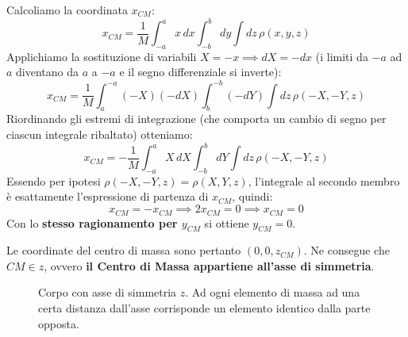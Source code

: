 Calcoliamo la coordinata $x_{CM}$:
\begin{equation}
    x_{CM} = \frac{1}{M} \int_{-a}^{a} x \, dx \int_{-b}^{b} dy \int dz \, \rho(x,y,z)
\end{equation}
Applichiamo la sostituzione di variabili $X = -x \implies dX = -dx$ (i limiti da $-a$ ad $a$ diventano da $a$ a $-a$ e il segno differenziale si inverte):
\begin{equation}
    x_{CM} = \frac{1}{M} \int_{a}^{-a} (-X) (-dX) \int_{b}^{-b} (-dY) \int dz \, \rho(-X,-Y,z)
\end{equation}
Riordinando gli estremi di integrazione (che comporta un cambio di segno per ciascun integrale ribaltato) otteniamo:
\begin{equation}
    x_{CM} = - \frac{1}{M} \int_{-a}^{a} X \, dX \int_{-b}^{b} dY \int dz \, \rho(-X,-Y,z)
\end{equation}
Essendo per ipotesi $\rho(-X,-Y,z) = \rho(X,Y,z)$, l'integrale al secondo membro è esattamente l'espressione di partenza di $x_{CM}$, quindi:
\begin{equation}
    x_{CM} = - x_{CM} \implies 2x_{CM} = 0 \implies x_{CM} = 0
\end{equation}
Con lo \textbf{stesso ragionamento per $y_{CM}$} si ottiene $y_{CM} = 0$.

Le coordinate del centro di massa sono pertanto $(0, 0, z_{CM})$. Ne consegue che $CM \in z$, ovvero \textbf{il Centro di Massa appartiene all'asse di simmetria}.

\begin{figure}[ht]
    \centering
    \caption{Corpo con asse di simmetria $z$. Ad ogni elemento di massa ad una certa distanza dall'asse corrisponde un elemento identico dalla parte opposta.}
\end{figure}
